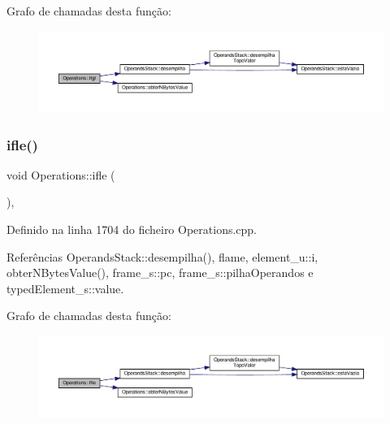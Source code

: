 Grafo de chamadas desta função\+:
\nopagebreak
\begin{figure}[H]
\begin{center}
\leavevmode
\includegraphics[width=350pt]{classOperations_afff52b972f58750ea8037aeb02dd22bc_cgraph}
\end{center}
\end{figure}
\mbox{\label{classOperations_a1ef1754372db2e5285a129389274dcc8}} 
\subsubsection{\texorpdfstring{ifle()}{ifle()}}
{\footnotesize\ttfamily void Operations\+::ifle (\begin{DoxyParamCaption}{ }\end{DoxyParamCaption})\hspace{0.3cm}{\ttfamily [static]}, {\ttfamily [private]}}



Definido na linha 1704 do ficheiro Operations.\+cpp.



Referências Operands\+Stack\+::desempilha(), flame, element\+\_\+u\+::i, obter\+N\+Bytes\+Value(), frame\+\_\+s\+::pc, frame\+\_\+s\+::pilha\+Operandos e typed\+Element\+\_\+s\+::value.

Grafo de chamadas desta função\+:
\nopagebreak
\begin{figure}[H]
\begin{center}
\leavevmode
\includegraphics[width=350pt]{classOperations_a1ef1754372db2e5285a129389274dcc8_cgraph}
\end{center}
\end{figure}
\mbox{\label{classOperations_a0a9460ea938fc3a9bbd2102578d50ee2}} 
